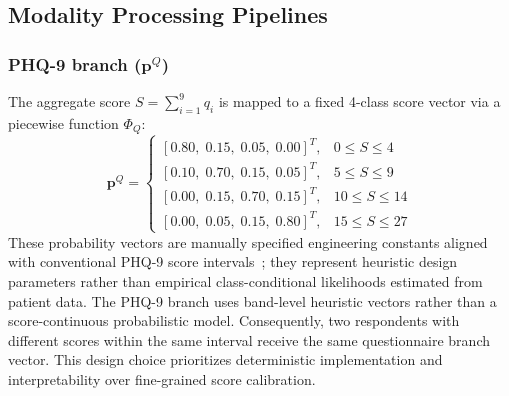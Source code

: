 \documentclass[10pt, conference, letterpaper]{IEEEtran}
\begin{document}
\subsection{Modality Processing Pipelines}

\subsubsection{PHQ-9 branch ($\mathbf{p}^Q$)}
The aggregate score $S = \sum_{i=1}^{9} q_i$ is mapped to a fixed 4-class
score vector via a piecewise function $\Phi_Q$:
\begin{equation}
  \mathbf{p}^Q =
  \begin{cases}
    [0.80,\;0.15,\;0.05,\;0.00]^T, & 0  \le S \le 4  \\
    [0.10,\;0.70,\;0.15,\;0.05]^T, & 5  \le S \le 9  \\
    [0.00,\;0.15,\;0.70,\;0.15]^T, & 10 \le S \le 14 \\
    [0.00,\;0.05,\;0.15,\;0.80]^T, & 15 \le S \le 27
  \end{cases}
  \label{eq:phq_probs}
\end{equation}
These probability vectors are manually specified engineering constants aligned
with conventional PHQ-9 score intervals~\cite{kroenke2001}; they represent heuristic design
parameters rather than empirical class-conditional likelihoods estimated from
patient data.
The PHQ-9 branch uses band-level heuristic vectors rather than a
score-continuous probabilistic model. Consequently, two respondents with
different scores within the same interval receive the same questionnaire
branch vector. This design choice prioritizes deterministic implementation
and interpretability over fine-grained score calibration.
\end{document}

